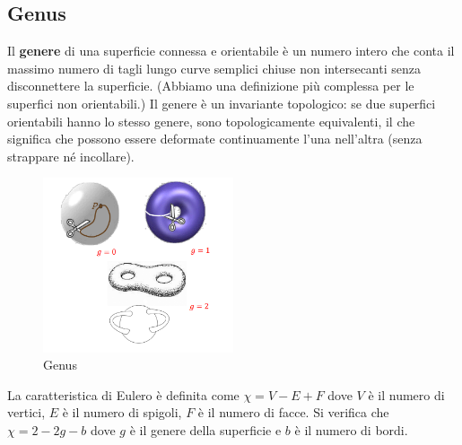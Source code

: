 \subsection{Genus}
Il \textbf{genere} di una superficie connessa e orientabile è un numero intero che conta il massimo numero di tagli lungo curve semplici chiuse non intersecanti senza disconnettere la superficie. (Abbiamo una definizione più complessa per le superfici non orientabili.)
Il genere è un invariante topologico: se due superfici orientabili hanno lo stesso genere, sono topologicamente equivalenti, il che significa che possono essere deformate continuamente l'una nell'altra (senza strappare né incollare).
\begin{figure}[H]
    \centering
    \includegraphics[width=0.5\textwidth]{images/Genus.png} 
    \caption{Genus}
    \label{fig:immagine}
\end{figure}
La caratteristica di Eulero è definita come $\chi = V - E + F$ dove $V$ è il numero di vertici, $E$ è il numero di spigoli, $F$ è il numero di facce.
Si verifica che $\chi = 2 - 2g - b$ dove $g$ è il genere della superficie e $b$ è il numero di bordi.





